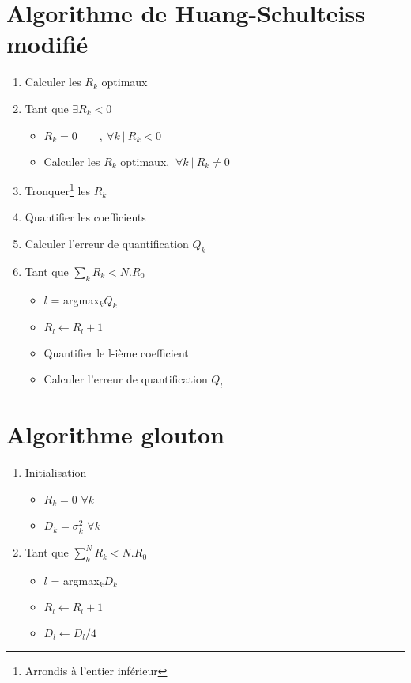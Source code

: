 \documentclass{article}
\begin{document}
\section{Algorithme de Huang-Schulteiss modifié}
\label{hsm_algo}
\begin{enumerate}[label=\textbf{\arabic*})]
	\item Calculer les $R_k$ optimaux
	\item Tant que $\exists R_k < 0$
	\begin{itemize}
		\item $R_k = 0 \qquad , \ \forall k \ | \ R_k < 0$
		\item Calculer les $R_k$ optimaux, $\ \forall k \ | \ R_k \neq 0$
	\end{itemize}
	\item Tronquer\footnote{Arrondis à l'entier inférieur} les $R_k$
	\item Quantifier les coefficients
	\item Calculer l'erreur de quantification $Q_k$
	\item Tant que $\sum\limits_k R_k < N.R_0$
	\begin{itemize}
		\item $l$ = argmax$_k Q_k$
		\item $ R_l \leftarrow R_l + 1$
		\item Quantifier le l-ième coefficient
		\item Calculer l'erreur de quantification $Q_l$
	\end{itemize}

\end{enumerate}

\section{Algorithme glouton}
\label{greedy_algo}
\begin{enumerate}[label=\textbf{\arabic*})]
	\item Initialisation
	\begin{itemize}
		\item $R_k = 0$ $\forall k$
		\item $D_k = \sigma_k^2$ $\forall k$
	\end{itemize}
	\item Tant que $\sum\limits_k^N R_k < N.R_0$
	\begin{itemize}
		\item $l$ = argmax$_k D_k$
		\item $R_l \leftarrow R_l + 1$
		\item $D_l \leftarrow D_l/4$
	\end{itemize}
\end{enumerate}
\end{document}
